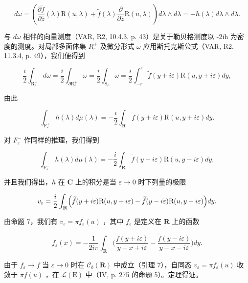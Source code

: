 \[
d \omega = \left(\frac {\partial \widetilde {f}}{\partial \overline {{z}}} (\lambda) \mathrm{R} (u, \lambda) + \widetilde {f} (\lambda) \frac {\partial}{\partial \overline {{z}}} \mathrm{R} (u, \lambda)\right) d \overline {{\lambda}} \wedge d \lambda = - h (\lambda) d \lambda \wedge d \overline {{\lambda}}.
\]

与 \(d\omega\) 相伴的向量测度（VAR, R2, 10.4.3, p. 43）是关于勒贝格测度以 -2ih 为密度的测度。对局部多面体集 \(R_{\varepsilon}^{+}\) 及微分形式 \(\omega\) 应用斯托克斯公式（VAR, R2, 11.3.4, p. 49），我们便得到

\[
\frac {i}{2} \int_ {\mathrm{R} _ {\varepsilon} ^ {+}} d \omega = \frac {i}{2} \int_ {\partial \mathrm{R} _ {\varepsilon} ^ {+}} \omega = \frac {i}{2} \int_ {\mathrm{S} _ {\varepsilon}} \omega = \frac {i}{2} \int_ {- r} ^ {r} \widetilde {f} (y + i \varepsilon) \mathrm{R} (u, y + i \varepsilon) d y,
\]

由此

\[
\int_ {\mathrm{F} _ {\varepsilon} ^ {+}} h (\lambda) d \mu (\lambda) = - \frac {i}{2} \int_ {\mathbf {R}} \widetilde {f} (y + i \varepsilon) \mathrm{R} (u, y + i \varepsilon) d y.
\]

对 \(F_{\varepsilon}^{-}\) 作同样的推理，我们得到

\[
\int_ {\mathrm{F} _ {\varepsilon} ^ {-}} h (\lambda) d \mu (\lambda) = - \frac {i}{2} \int_ {\mathbf {R}} \widetilde {f} (y - i \varepsilon) \mathrm{R} (u, y - i \varepsilon) d y,
\]

并且我们得出，\(h\) 在 \(\mathbf{C}\) 上的积分是当 \(\varepsilon\to0\) 时下列量的极限

\[
v _ {\varepsilon} = \frac {i}{2} \int_ {\mathbf {R}} \Bigl (\widetilde {f} (y + i \varepsilon) \mathrm{R} (u, y + i \varepsilon) - \widetilde {f} (y - i \varepsilon) \mathrm{R} (u, y - i \varepsilon) \Bigr) d y.
\]

由命题 7，我们有 \(v_{\varepsilon} = \pi f_{\varepsilon}(u)\) ，其中 \(f_{\varepsilon}\) 是定义在 \(\mathbf{R}\) 上的函数

\[
f _ {\varepsilon} (x) = - \frac {1}{2 i \pi} \int_ {\mathbf {R}} \biggl (\frac {\widetilde {f} (y + i \varepsilon)}{y - x + i \varepsilon} - \frac {\widetilde {f} (y - i \varepsilon)}{y - x - i \varepsilon} \biggr) d y.
\]

由于 \(f_{\varepsilon} \to f\) 当 \(\varepsilon \to 0\) 时在 \(\mathcal{C}_{b}(\mathbf{R})\) 中成立（引理 7），自同态 \(v_{\varepsilon} = \pi f_{\varepsilon}(u)\) 收敛于 \(\pi f(u)\) ，在 \(\mathcal{L}(\mathrm{E})\) 中（IV, p. 275 的命题 5）。定理得证。

